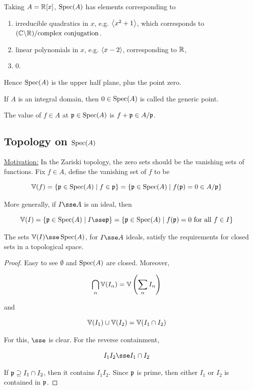 \documentclass{article}
\begin{document}
\begin{example}
    Taking \(A = \mathbb{R}[x]\), \(\operatorname{Spec}(A)\) has elements corresponding to 
    
    \begin{enumerate}
        \item irreducible quadratics in \(x\), e.g. \(\left\langle x^2 + 1 \right\rangle\), which corresponds to \((\mathbb{C}\backslash\mathbb{R})/\text{complex conjugation}\).
        \item linear polynomials in \(x\), e.g. \(\left\langle x-2 \right\rangle\), corresponding to \(\mathbb{R}\),
        \item \(0\).
    \end{enumerate}

    Hence \(\operatorname{Spec}(A)\) is the upper half plane, plus the point zero.
\end{example}

\begin{definition}
    If \(A\) is an integral domain, then \(0 \in \operatorname{Spec}(A)\) is called the generic point.
\end{definition}

\begin{remark}
    The value of \(f \in A\) at \(\mathfrak{p} \in \operatorname{Spec}(A)\) is \(f + \mathfrak{p} \in A/\mathfrak{p}\).
\end{remark}

\subsection{Topology on \(\operatorname{Spec}(A)\)}

\underline{Motivation:} In the Zariski topology, the zero sets should be the vanishing sets of functions. Fix \(f \in A\), define the vanishing set of \(f\) to be

\[\mathbb{V}(f) = \left\{\mathfrak{p} \in \operatorname{Spec}(A) \mid f \in \mathfrak{p}\right\} = \left\{\mathfrak{p} \in \operatorname{Spec}(A) \mid f(\mathfrak{p}) = 0 \in A/\mathfrak{p}\right\}\]

More generally, if \(I \sse A\) is an ideal, then

\[\van(I) = \left\{\mfp \in \Spec(A) \mid I \sse \mfp\right\} = \left\{\mfp \in \Spec(A) \mid f(\mfp) = 0 \text{ for all }f\in I\right\}\]

\begin{definition}
    The sets \(\van(I) \sse \Spec(A)\), for \(I \sse A\) ideals, satisfy the requirements for closed sets in a topological space. 
\end{definition}

\begin{proof}
    Easy to see \(\emptyset\) and \(\operatorname{Spec}(A)\) are closed. Moreover,

    \[\bigcap_\alpha \mathbb{V}(I_\alpha) = \mathbb{V}\left(\sum_\alpha I_\alpha\right)\]

    and

    \[\mathbb{V}(I_1) \cup \mathbb{V}(I_2) = \mathbb{V}(I_1 \cap I_2)\]

    For this, \(\sse\) is clear. For the reverse containment,

    \[I_1I_2 \sse I_1\cap I_2\]

    If \(\mathfrak{p} \supseteq I_1 \cap I_2\), then it contains \(I_1I_2\). Since \(\mathfrak{p}\) is prime, then either \(I_1\) or \(I_2\) is contained in \(\mathfrak{p}\).
\end{proof}
\end{document}

